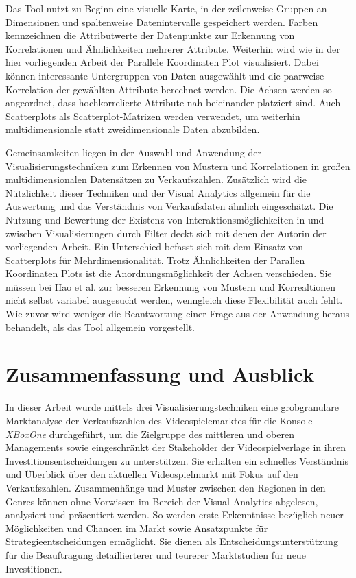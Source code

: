 \documentclass[usegeometry=true]{scrartcl}
\begin{document}
Das Tool nutzt zu Beginn eine visuelle Karte, in der zeilenweise Gruppen an Dimensionen und spaltenweise Datenintervalle gespeichert werden.
Farben kennzeichnen die Attributwerte der Datenpunkte zur Erkennung von Korrelationen und Ähnlichkeiten mehrerer Attribute.
Weiterhin wird wie in der hier vorliegenden Arbeit der Parallele Koordinaten Plot visualisiert. 
Dabei können interessante Untergruppen von Daten ausgewählt und die paarweise Korrelation der gewählten Attribute berechnet werden. 
Die Achsen werden so angeordnet, dass hochkorrelierte Attribute nah beieinander platziert sind. 
Auch Scatterplots als Scatterplot-Matrizen werden verwendet, um weiterhin multidimensionale statt zweidimensionale Daten abzubilden.

Gemeinsamkeiten liegen in der Auswahl und Anwendung der Visualisierungstechniken zum Erkennen von Mustern und Korrelationen 
in großen multidimensionalen Datensätzen zu Verkaufszahlen.
Zusätzlich wird die Nützlichkeit dieser Techniken und der Visual Analytics allgemein für die Auswertung und 
das Verständnis von Verkaufsdaten ähnlich eingeschätzt.
Die Nutzung und Bewertung der Existenz von Interaktionsmöglichkeiten in und zwischen Visualisierungen durch Filter 
deckt sich mit denen der Autorin der vorliegenden Arbeit.
Ein Unterschied befasst sich mit dem Einsatz von Scatterplots für Mehrdimensionalität.
Trotz Ähnlichkeiten der Parallen Koordinaten Plots ist die Anordnungsmöglichkeit der Achsen verschieden. 
Sie müssen bei Hao et al. zur besseren Erkennung von Mustern und Korrealtionen nicht selbst variabel ausgesucht werden, 
wenngleich diese Flexibilität auch fehlt.
Wie zuvor wird weniger die Beantwortung einer Frage aus der Anwendung heraus behandelt, als das Tool allgemein vorgestellt.

\section{Zusammenfassung und Ausblick}
In dieser Arbeit wurde mittels drei Visualisierungstechniken eine grobgranulare Marktanalyse 
der Verkaufszahlen des Videospielemarktes für die Konsole \textit{XBoxOne} durchgeführt, 
um die Zielgruppe des mittleren und oberen Managements sowie eingeschränkt der Stakeholder der Videospielverlage 
in ihren Investitionsentscheidungen zu unterstützen.
Sie erhalten ein schnelles Verständnis und Überblick über den aktuellen Videospielmarkt mit Fokus auf den Verkaufszahlen.
Zusammenhänge und Muster zwischen den Regionen in den Genres können ohne Vorwissen im Bereich der Visual Analytics abgelesen, analysiert und präsentiert werden.
So werden erste Erkenntnisse bezüglich neuer Möglichkeiten und Chancen im Markt sowie Ansatzpunkte für Strategieentscheidungen ermöglicht. 
Sie dienen als Entscheidungsunterstützung für die Beauftragung detaillierterer und teurerer Marktstudien für neue Investitionen.
 
\end{document}
